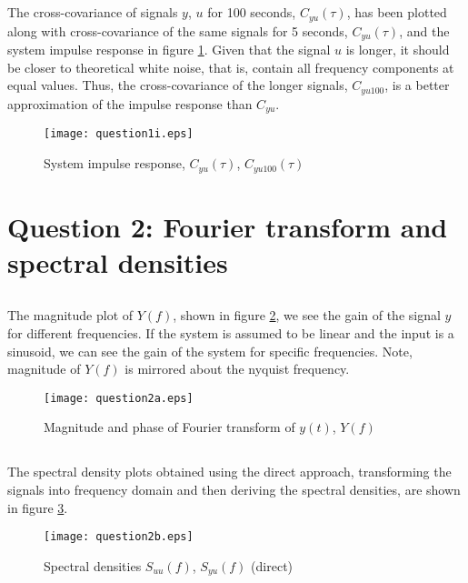\documentclass[times,12pt,reqno]{amsart}
\begin{document}
\subsection{}
The cross-covariance of signals $y$, $u$ for 100 seconds, $C_{yu}(\tau)$, has
been plotted along with cross-covariance of the same signals for 5 seconds,
$C_{yu}(\tau)$, and the system impulse response in figure \ref{fig:q1i}. Given
that the signal $u$ is longer, it should be closer to theoretical white noise,
that is, contain all frequency components at equal values. Thus, the
cross-covariance of the longer signals, $C_{yu100}$, is a better approximation
of the impulse response than $C_{yu}$.
\begin{figure}[H]
    \begin{center}
        \texttt{[image: question1i.eps]}
    \end{center}
    \caption{System impulse response, $C_{yu}(\tau)$, $C_{yu100}(\tau)$}
    \label{fig:q1i}
\end{figure}

\newpage
\section{Question 2: Fourier transform and spectral densities}

\subsection{}
The magnitude plot of $Y(f)$, shown in figure \ref{fig:q2a}, we see the gain of the
signal $y$ for different frequencies. If the system is assumed to be linear and
the input is a sinusoid, we can see the gain of the system for specific
frequencies. Note, magnitude of $Y(f)$ is mirrored about the nyquist frequency.
\begin{figure}[H]
    \begin{center}
        \texttt{[image: question2a.eps]}
    \end{center}
    \caption{Magnitude and phase of Fourier transform of $y(t)$, $Y(f)$}
    \label{fig:q2a}
\end{figure}

\subsection{}

The spectral density plots obtained using the direct approach, transforming the
signals into frequency domain and then deriving the spectral densities, are
shown in figure \ref{fig:q2b}.
\begin{figure}[H]
    \begin{center}
        \texttt{[image: question2b.eps]}
    \end{center}
    \caption{Spectral densities $S_{uu}(f)$, $S_{yu}(f)$ (direct)}
    \label{fig:q2b}
\end{figure}
\end{document}
